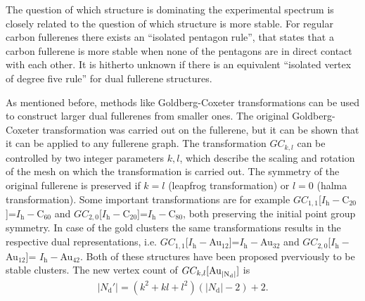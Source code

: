 The question of which structure is dominating the experimental spectrum is
closely related to the question of which structure is more stable. For regular
carbon fullerenes there exists an ``isolated pentagon rule'', that states that a
carbon fullerene is more stable when none of the pentagons are in direct contact
with each other.\autocite{Kroto_stabilityfullerenesCn_1987} It is hitherto
unknown if there is an equivalent ``isolated vertex of degree five rule'' for
dual fullerene structures.

As mentioned before, methods like Goldberg-Coxeter transformations can be used
to construct larger dual fullerenes from smaller
ones.\autocite{Goldberg_ClassMultiSymmetricPolyhedra_1937,Coxeter-1971,Dutour_GoldbergCoxeterConstructionvalent_2004}
The original Goldberg-Coxeter transformation was carried out on the 
fullerene\autocite{Goldberg_ClassMultiSymmetricPolyhedra_1937,Coxeter-1971}, but
it can be shown that it can be applied to any fullerene
graph.\autocite{Schwerdtfeger_topologyfullerenes_2015} The transformation
$GC_{k,l}$ can be controlled by two integer parameters $k,l$, which describe the
scaling and rotation of the mesh on which the transformation is carried out. The
symmetry of the original fullerene is preserved if $k=l$ (leapfrog
transformation) or $l=0$  (halma transformation). Some important transformations
are for example
$GC_{1,1}$[$I_\mathrm{h}-$C$_{20}$]=$I_\mathrm{h}-$C$_{60}$\autocite{Fowler-atlas-2006}
and $GC_{2,0}$[$I_\mathrm{h}-$C$_{20}$]=$I_\mathrm{h}-$C$_{80}$, both preserving
the initial point group symmetry. In case of the gold clusters the same
transformations results in the respective dual representations, i.e.
$GC_{1,1}$[$I_\mathrm{h}-$Au$_{12}$]=$I_\mathrm{h}-$Au$_{32}$ and
$GC_{2,0}$[$I_\mathrm{h}-$Au$_{12}$]= $I_\mathrm{h}-$Au$_{42}$. Both of these
structures have been proposed pverviously to be stable
clusters.\autocite{Johansson_Au3224CaratGolden_2004} The new vertex count of
$GC_{k,l}[\ce{Au_{|N_d|}}]$ is
%
\begin{align}
    |N_\text{d}'| = (k^2+kl+l^2)(|N_\text{d}|-2) + 2.\label{eqn:dualvertex}
\end{align}


